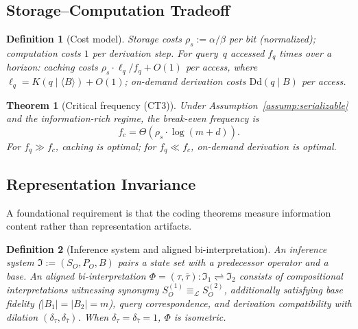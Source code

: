 \documentclass[journal]{IEEEtran}
\newcommand{\Dd}{\text{Dd}}
\newtheorem{theorem}{Theorem}[section]
\newtheorem{definition}{Definition}[section]
\numberwithin{equation}{section}
\begin{document}
\subsection{Storage--Computation Tradeoff}
\label{subsec:tradeoff}

\begin{definition}[Cost model]
\label{def:cost-model}
Storage costs $\rho_s:=\alpha/\beta$ per bit (normalized);
computation costs $1$ per derivation step.
For query~$q$ accessed $f_q$ times over a horizon:
caching costs $\rho_s\cdot\ell_q/f_q+O(1)$ per access,
where $\ell_q=K(q\mid\langle B\rangle)+O(1)$;
on-demand derivation costs $\Dd(q\mid B)$ per access.
\end{definition}

\begin{theorem}[Critical frequency \textup{(CT3)}]
\label{thm:freq_tradeoff}
Under Assumption~\textup{\ref{assump:serializable}} and the
information-rich regime, the break-even frequency is
\begin{equation}\label{eq:critical-freq}
  f_c=\Theta(\rho_s\cdot\log(m{+}d)).
\end{equation}
For $f_q\gg f_c$, caching is optimal; for $f_q\ll f_c$,
on-demand derivation is optimal.
\end{theorem}

\subsection{Representation Invariance}
\label{subsec:rep-inv}

A foundational requirement is that the coding theorems measure
information content rather than representation artifacts.

\begin{definition}[Inference system and aligned
  bi-interpretation]
\label{def:inference-system}
An \emph{inference system}
$\mathfrak{I}:=(S_O,P_O,B)$ pairs a state set with a
predecessor operator and a base.
An \emph{aligned bi-interpretation}
$\Phi=(\tau,\bar\tau):
\mathfrak{I}_1\rightleftharpoons\mathfrak{I}_2$
consists of compositional interpretations witnessing
synonymy $S_O^{(1)}\equiv_{\mathcal L}S_O^{(2)}$,
additionally satisfying base fidelity
\textup{(}$|B_1|=|B_2|=m$\textup{)}, query
correspondence, and derivation compatibility with
dilation $(\delta_\tau,\delta_{\bar\tau})$.
When $\delta_\tau=\delta_{\bar\tau}=1$, $\Phi$ is
\emph{isometric}.
\end{definition}
\end{document}
